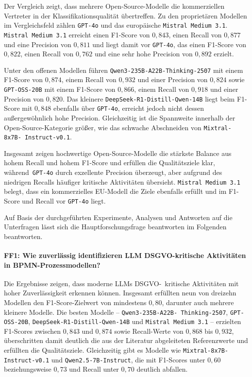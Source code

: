 Der Vergleich zeigt, dass mehrere Open-Source-Modelle die kommerziellen Vertreter in der Klassifikationsqualität übertreffen. Zu den proprietären Modellen im Vergleichsfeld zählen \texttt{GPT-4o} und das europäische \texttt{Mistral Medium 3.1}. \texttt{Mistral Medium 3.1} erreicht einen F1-Score von $0{,}843$, einen Recall von $0{,}877$ und eine Precision von $0{,}811$ und liegt damit vor \texttt{GPT-4o}, das einen F1-Score von $0{,}822$, einen Recall von $0{,}762$ und eine sehr hohe Precision von $0{,}892$ erzielt.

Unter den offenen Modellen führen \texttt{Qwen3-235B-A22B-Thinking-2507} mit einem F1-Score von $0{,}874$, einem Recall von $0{,}932$ und einer Precision von $0{,}824$ sowie \texttt{GPT-OSS-20B} mit einem F1-Score von $0{,}866$, einem Recall von $0{,}918$ und einer Precision von $0{,}820$. Das kleinere \texttt{DeepSeek-R1-Distill-Qwen-14B} liegt beim F1-Score mit $0{,}848$ ebenfalls über \texttt{GPT-4o}, erreicht jedoch nicht dessen außergewöhnlich hohe Precision. Gleichzeitig ist die Spannweite innerhalb der Open-Source-Kategorie größer, wie das schwache Abschneiden von \texttt{Mixtral-8x7B-\linebreak~Instruct-v0.1}.

Insgesamt zeigen hochwertige Open-Source-Modelle die stärkste Balance aus hohem Recall und hohem F1-Score und erfüllen die Qualitätsziele klar, während\linebreak~\texttt{GPT-4o} durch exzellente Precision überzeugt, aber aufgrund des niedrigen Recalls häufiger kritische Aktivitäten übersieht. \texttt{Mistral Medium 3.1} belegt, dass ein kommerzielles \ac{EU}-Modell die Ziele ebenfalls erfüllt und im F1-Score und Recall vor \texttt{GPT-4o} liegt.

Auf Basis der durchgeführten Experimente, Analysen und Antworten auf die Unterfragen lässt sich die Hauptforschungsfrage beantworten im Folgenden beantworten.

\paragraph{FF1: Wie zuverlässig identifizieren LLM DSGVO-kritische Aktivitäten in BPMN-Prozessmodellen?}

Die Ergebnisse zeigen, dass moderne \acp{LLM} \ac{DSGVO}-\linebreak~kritische Aktivitäten mit hoher Zuverlässigkeit erkennen können. Insgesamt erfüllten neun von dreizehn Modellen den F1-Score-Zielwert von mindestens $0{,}80$, darunter auch mehrere kleinere Modelle. Die besten Modelle – \texttt{Qwen3-235B-A22B-\linebreak~Thinking-2507}, \texttt{GPT-OSS-20B}, \texttt{DeepSeek-R1-Distill-Qwen-14B} und \texttt{Mistral Medium 3.1} – erzielten F1-Scores zwischen $0{,}843$ und $0{,}874$ sowie Recall-Werte von $0{,}868$ bis $0{,}932$, überschritten damit deutlich die aus der Literatur abgeleiteten Referenzwerte und erfüllten die Qualitätsziele. Gleichzeitig gibt es Modelle wie \texttt{Mixtral-8x7B-Instruct-v0.1} und \texttt{Qwen2.5-7B-Instruct}, die mit F1-Scores unter $0{,}60$ beziehungsweise $0{,}73$ und Recall unter $0{,}70$ deutlich abfallen.

